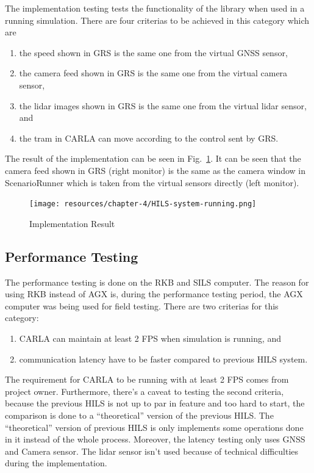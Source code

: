 The implementation testing tests the functionality of the library when used in a
running simulation. There are four criterias to be achieved in this category which are

\begin{enumerate}
	\item the speed shown in GRS is the same one from the virtual GNSS sensor,
	\item the camera feed shown in GRS is the same one from the virtual camera
	      sensor,
	\item the lidar images shown in GRS is the same one from the virtual lidar
	      sensor, and
	\item the tram in CARLA can move according to the control sent by GRS.
\end{enumerate}

The result of the implementation can be seen in
Fig.~\ref{fig-section-6-implementation-results}. It can be seen that the camera
feed shown in GRS (right monitor) is the same as the camera window in
ScenarioRunner which is taken from the virtual sensors directly (left monitor).

\begin{figure}[htbp]
	\centerline{\texttt{[image: resources/chapter-4/HILS-system-running.png]}}
	\caption{Implementation Result}
	\label{fig-section-6-implementation-results}
\end{figure}

\subsection{Performance Testing}

The performance testing is done on the RKB and SILS computer. The reason for
using RKB instead of AGX is, during the performance testing period, the AGX
computer was being used for field testing. There are two criterias for this
category:
\begin{enumerate}
	\item CARLA can maintain at least 2 FPS when simulation is running, and
	\item communication latency have to be faster compared to previous HILS
	      system.
\end{enumerate}
The requirement for CARLA to be running with at least 2 FPS comes from project
owner. Furthermore, there's a caveat to testing the second criteria, because the
previous HILS is not up to par in feature and too hard to start, the comparison
is done to a ``theoretical'' version of the previous HILS. The ``theoretical''
version of previous HILS is only implements some operations done in it instead
of the whole process. Moreover, the latency testing only uses GNSS and Camera
sensor. The lidar sensor isn't used because of technical difficulties during the
implementation.

